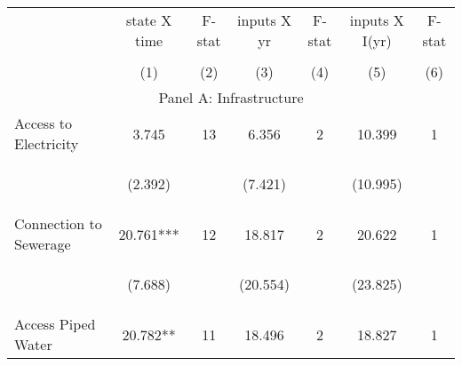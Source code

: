 \begin{tabular}{lcccccc}


\toprule


\multicolumn{1}{l}{} & \multicolumn{1}{c}{state X time} & \multicolumn{1}{c}{F-stat} & \multicolumn{1}{c}{inputs X yr} & \multicolumn{1}{c}{F-stat} & \multicolumn{1}{c}{inputs X I(yr)} & \multicolumn{1}{c}{F-stat}  \\

\cmidrule(l{1mm}r{1mm}){2-3} \cmidrule(l{1mm}r{1mm}){4-5} \cmidrule(l{1mm}r{1mm}){6-7}   \\

 & (1) & (2) & (3) & (4) & (5) & (6)  \\ 
 

\hline

\multicolumn{7}{c}{Panel A: Infrastructure}   \\                                                          

Access to Electricity   	&  3.745   
				&  13  
				&   6.356  
				&  2 
				&  10.399  
				&  1 \\

\vspace{4pt} &  \begin{footnotesize}(2.392)\end{footnotesize}   & &
			    \begin{footnotesize}(7.421)\end{footnotesize}   & &
			    \begin{footnotesize}(10.995)\end{footnotesize}   & \\          


Connection to Sewerage   &  20.761***   &  12  &   18.817  &  2 &  20.622  &  1   \\

\vspace{4pt} &  \begin{footnotesize}(7.688)\end{footnotesize}   & &
			    \begin{footnotesize}(20.554)\end{footnotesize}   & &
			    \begin{footnotesize}(23.825)\end{footnotesize}   &
			     \\          


Access Piped Water   &  20.782**   &  11  &   18.496  &  2 &  18.827  &  1   \\



\end{tabular}
